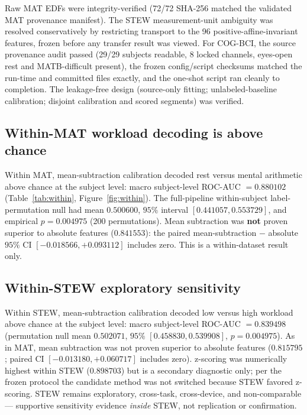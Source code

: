 \documentclass[11pt]{article}
\begin{document}
Raw MAT EDFs were integrity-verified (72/72 SHA-256 matched the validated MAT
provenance manifest). The STEW measurement-unit ambiguity was resolved
conservatively by restricting transport to the 96 positive-affine-invariant
features, frozen before any transfer result was viewed. For COG-BCI, the source
provenance audit passed (29/29 subjects readable, 8 locked channels, eyes-open
rest and MATB-difficult present), the frozen config/script checksums matched the
run-time and committed files exactly, and the one-shot script ran cleanly to
completion. The leakage-free design (source-only fitting; unlabeled-baseline
calibration; disjoint calibration and scored segments) was verified.

\subsection{Within-MAT workload decoding is above chance}

Within MAT, mean-subtraction calibration decoded rest versus mental arithmetic
above chance at the subject level: macro subject-level ROC-AUC $= 0.880102$
(Table~\ref{tab:within}, Figure~\ref{fig:within}). The full-pipeline
within-subject label-permutation null had mean $0.500600$, $95\%$ interval
$[0.441057, 0.553729]$, and empirical $p = 0.004975$ (200 permutations).
Mean subtraction was \textbf{not} proven superior to absolute features
($0.841553$): the paired mean-subtraction $-$ absolute $95\%$ CI
$[-0.018566, +0.093112]$ includes zero. This is a within-dataset result only.

\subsection{Within-STEW exploratory sensitivity}

Within STEW, mean-subtraction calibration decoded low versus high workload above
chance at the subject level: macro subject-level ROC-AUC $= 0.839498$
(permutation null mean $0.502071$, $95\%$ $[0.458830, 0.539908]$,
$p = 0.004975$). As in MAT, mean subtraction was not proven superior to absolute
features ($0.815795$; paired CI $[-0.013180, +0.060717]$ includes zero).
z-scoring was numerically highest within STEW ($0.898703$) but is a secondary
diagnostic only; per the frozen protocol the candidate method was not switched
because STEW favored z-scoring. STEW remains exploratory, cross-task,
cross-device, and non-comparable --- supportive sensitivity evidence
\textit{inside} STEW, not replication or confirmation.
\end{document}
